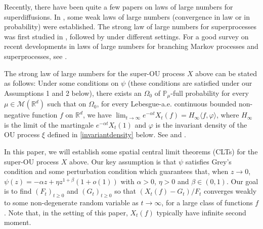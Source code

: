 \documentclass[12pt,a4paper]{amsart}
\theoremstyle{plain}
\theoremstyle{definition}
\numberwithin{equation}{section}
\begin{document}
Recently, there have been quite a few papers on laws of large numbers for superdiffusions.
In \cite{Englander2009Law, EnglanderWinter2006Law, EnglanderTuraev2002A-scaling}, some weak laws of large numbers (convergence in law or in probability) were established.
The strong law of large numbers for superprocesses was first studied in \cite{ChenRenWang2008An-almost}, followed by \cite{ChenRenSongZhang2015Strong-law, ChenRenYang2019Skeleton, EckhoffKyprianouWinkel2015Spines, KouritzinRen2014A-strong, LiuRenSong2013Strong, Wang2010An-almost} under different settings.
For a good survey on recent developments in laws of large numbers for branching Markov processes and superprocesses, see \cite{EckhoffKyprianouWinkel2015Spines}.


The strong law of large numbers for the super-OU process $X$ above can be stated as follows:
Under some conditions on $\psi$ (these conditions are satisfied under our Assumptions 1 and 2 below),
there exists an $\Omega_0$ of $\mathbb{P}_\mu$-full probability for every $\mu\in\mathcal M(\mathbb R^d)$ such that on $\Omega_0$, for every Lebesgue-a.\/e. continuous bounded non-negative function $f$ on $\mathbb R^d$, we have
 $\lim_{t\to\infty} e^{-\alpha t} X_t(f) =H_\infty\langle f, \varphi\rangle $,
where $H_\infty$ is the limit of the martingale $e^{-\alpha t}X_t(1)$
and $\varphi$ is the invariant density of the OU process $\xi$ defined in \eqref{invariantdensity} below.
See \cite[Theorem 2.13 \& Example 8.1]{ChenRenYang2019Skeleton} and \cite[Theorem 1.2 \& Example 4.1]{EckhoffKyprianouWinkel2015Spines}.

In this paper, we will establish some spatial central limit theorems (CLTs) for the super-OU process $X$ above.
Our key assumption is that $\psi$ satisfies Grey's condition and some perturbation condition which guarantees that,
when  $z\to 0$, $\psi(z)=-\alpha z + \eta z^{1+\beta} (1+o(1))$ with $\alpha > 0$, $\eta>0$ and $\beta\in (0, 1)$.
Our  goal is to find $(F_t)_{t\geq 0}$ and $(G_t)_{t\geq 0}$ so that
$ (X_t(f) -G_t)/F_t $ converges weakly to some non-degenerate random variable as $t\rightarrow\infty$, for a large class of functions $f$.
Note that, in the setting of this paper, $X_t(f)$ typically have infinite second moment.
\end{document}
